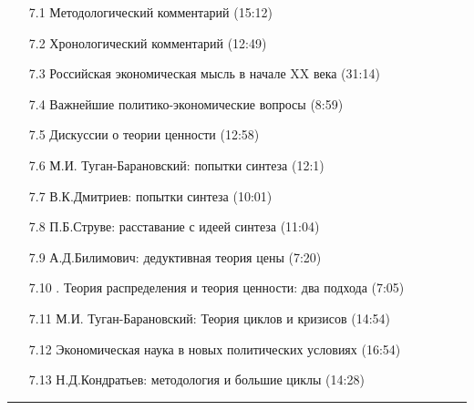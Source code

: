 \documentclass[a4paper]{article}
\begin{document}
{{\begin{description}
\begin{itemize}
\item[7.1]  Методологический комментарий (15:12)
\item[7.2]  Хронологический комментарий (12:49)
\item[7.3]  Российская экономическая мысль в начале XX века (31:14)
\item[7.4]  Важнейшие политико-экономические вопросы (8:59)
\item[7.5]  Дискуссии о теории ценности (12:58)
\item[7.6]  М.И. Туган-Барановский: попытки синтеза (12:1)
\item[7.7]  В.К.Дмитриев: попытки синтеза (10:01)
\item[7.8]  П.Б.Струве: расставание с идеей синтеза (11:04)
\item[7.9]  А.Д.Билимович: дедуктивная теория цены (7:20)
\item[7.10]. Теория распределения и теория ценности: два подхода (7:05)
\item[7.11]  М.И. Туган-Барановский: Теория циклов и кризисов (14:54)
\item[7.12]  Экономическая наука в новых политических условиях (16:54)
\item[7.13]  Н.Д.Кондратьев: методология и большие циклы (14:28)
\end{itemize}
\end{description}}}
\hrule
\end{document}
